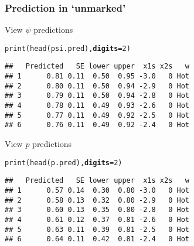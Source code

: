 \documentclass[color=usenames,dvipsnames]{beamer}\usepackage[]{graphicx}\usepackage[]{color}
\makeatletter
\newcommand{\hlnum}[1]{\textcolor[rgb]{0.69,0.494,0}{#1}}%
\newcommand{\hlstd}[1]{\textcolor[rgb]{0,0,0}{#1}}%
\newcommand{\hlkwc}[1]{\textcolor[rgb]{0,0,0}{\textbf{#1}}}%
\newcommand{\hlkwd}[1]{\textcolor[rgb]{0.004,0.004,0.506}{#1}}%
\newenvironment{kframe}{%
 \def\at@end@of@kframe{}%
 \ifinner\ifhmode%
  \def\at@end@of@kframe{\end{minipage}}%
  \begin{minipage}{\columnwidth}%
 \fi\fi%
 \def\FrameCommand##1{\hskip\@totalleftmargin \hskip-\fboxsep
 \colorbox{shadecolor}{##1}\hskip-\fboxsep
     \hskip-\linewidth \hskip-\@totalleftmargin \hskip\columnwidth}%
 \MakeFramed {\advance\hsize-\width
   \@totalleftmargin\z@ \linewidth\hsize
   \@setminipage}}%
 {\par\unskip\endMakeFramed%
 \at@end@of@kframe}
\newenvironment{knitrout}{}{} %
\makeatother
\begin{document}
\begin{frame}[fragile]
  \frametitle{Prediction in `unmarked'}
  \small
  View $\psi$ predictions
\begin{knitrout}\footnotesize
{}\color{fgcolor}\begin{kframe}
\begin{alltt}
\hlkwd{print}\hlstd{(}\hlkwd{head}\hlstd{(psi.pred),} \hlkwc{digits}\hlstd{=}\hlnum{2}\hlstd{)}
\end{alltt}
\begin{verbatim}
##   Predicted   SE lower upper  x1s x2s   w
## 1      0.81 0.11  0.50  0.95 -3.0   0 Hot
## 2      0.80 0.11  0.50  0.94 -2.9   0 Hot
## 3      0.79 0.11  0.50  0.94 -2.8   0 Hot
## 4      0.78 0.11  0.49  0.93 -2.6   0 Hot
## 5      0.77 0.11  0.49  0.92 -2.5   0 Hot
## 6      0.76 0.11  0.49  0.92 -2.4   0 Hot
\end{verbatim}
\end{kframe}
\end{knitrout}
\pause
\vfill
  View $p$ predictions
\begin{knitrout}\footnotesize
{}\color{fgcolor}\begin{kframe}
\begin{alltt}
\hlkwd{print}\hlstd{(}\hlkwd{head}\hlstd{(p.pred),} \hlkwc{digits}\hlstd{=}\hlnum{2}\hlstd{)}
\end{alltt}
\begin{verbatim}
##   Predicted   SE lower upper  x1s x2s   w
## 1      0.57 0.14  0.30  0.80 -3.0   0 Hot
## 2      0.58 0.13  0.32  0.80 -2.9   0 Hot
## 3      0.60 0.13  0.35  0.80 -2.8   0 Hot
## 4      0.61 0.12  0.37  0.81 -2.6   0 Hot
## 5      0.63 0.11  0.39  0.81 -2.5   0 Hot
## 6      0.64 0.11  0.42  0.81 -2.4   0 Hot
\end{verbatim}
\end{kframe}
\end{knitrout}
\end{frame}
\end{document}
